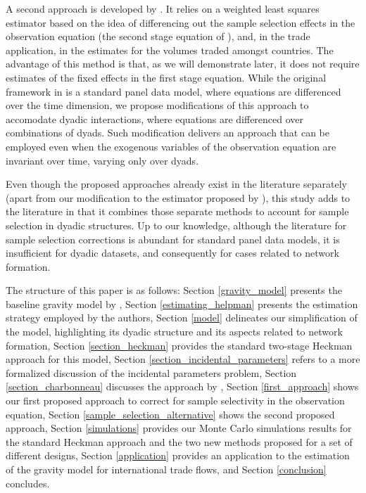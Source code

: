 A second approach is developed by \cite{kyriazidou1997estimation}. It relies on a weighted least squares estimator based on the idea of differencing out the sample selection effects in the observation equation (the second stage equation of \cite{heckman1979sample}), and, in the trade application, in the estimates for the volumes traded amongst countries. The advantage of this method is that, as we will demonstrate later, it does not require estimates of the fixed effects in the first stage equation. While the original framework in \cite{kyriazidou1997estimation} is a standard panel data model, where equations are differenced over the time dimension, we propose modifications of this approach to accomodate dyadic interactions, where equations are differenced over combinations of dyads. Such modification delivers an approach that can be employed even when the exogenous variables of the observation equation are invariant over time, varying only over dyads.

Even though the proposed approaches already exist in the literature separately (apart from our modification to the estimator proposed by \cite{kyriazidou1997estimation}), this study adds to the literature in that it combines those separate methods to account for sample selection in dyadic structures. Up to our knowledge, although the literature for sample selection corrections is abundant for standard panel data models, it is insufficient for dyadic datasets, and consequently for cases related to network formation.

The structure of this paper is as follows: Section \ref{gravity_model} presents the baseline gravity model by \cite{helpman2008estimating}, Section \ref{estimating_helpman} presents the estimation strategy employed by the authors, Section \ref{model} delineates our simplification of the model, highlighting its dyadic structure and its aspects related to network formation, Section \ref{section_heckman} provides the standard two-stage Heckman approach for this model, Section \ref{section_incidental_parameters} refers to a more formalized discussion of the incidental parameters problem, Section \ref{section_charbonneau} discusses the approach by \cite{charbonneau2017multiple}, Section \ref{first_approach} shows our first proposed approach to correct for sample selectivity in the observation equation, Section \ref{sample_selection_alternative} shows the second proposed approach, Section \ref{simulations} provides our Monte Carlo simulations results for the standard Heckman approach and the two new methods proposed for a set of different designs, Section \ref{application} provides an application to the estimation of the gravity model for international trade flows, and Section \ref{conclusion} concludes.


